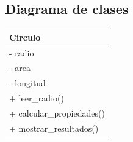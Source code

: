 \documentclass[11pt, a4paper]{article}
\newcommand{\clasebox}[3]{%
\begin{center}
\begin{tabular}{|l|}
\hline
\textbf{#1} \\
\hline
#2
\hline
#3
\hline
\end{tabular}
\end{center}
}
\begin{document}
\subsection{Diagrama de clases}
\clasebox{Circulo}
{%
- radio \\
- area \\
- longitud \\
}
{%
+ leer\_radio() \\
+ calcular\_propiedades() \\
+ mostrar\_resultados() \\
}
\end{document}
